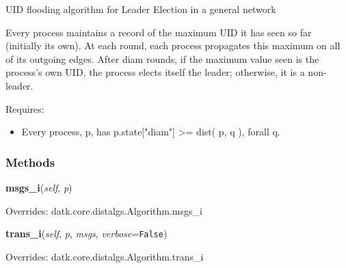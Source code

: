 UID flooding algorithm for Leader Election in a general network

Every process maintains a record of the maximum UID it has seen so far 
(initially its own). At each round, each process propagates this maximum on
all of its outgoing edges. After diam rounds, if the maximum value seen is 
the process's own UID, the process elects itself the leader; otherwise, it 
is a non-leader.

Requires:

\begin{itemize}
\setlength{\parskip}{0.6ex}
  \item Every process, p, has p.state["diam"] {\textgreater}= dist( p, q ), 
    forall q.

\end{itemize}



  \subsubsection{Methods}

    \vspace{0.5ex}

\hspace{.8\funcindent}\begin{boxedminipage}{\funcwidth}

    \raggedright \textbf{msgs\_i}(\textit{self}, \textit{p})

\setlength{\parskip}{2ex}
\setlength{\parskip}{1ex}
      Overrides: datk.core.distalgs.Algorithm.msgs\_i

    \end{boxedminipage}

    \vspace{0.5ex}

\hspace{.8\funcindent}\begin{boxedminipage}{\funcwidth}

    \raggedright \textbf{trans\_i}(\textit{self}, \textit{p}, \textit{msgs}, \textit{verbose}={\tt False})

\setlength{\parskip}{2ex}
\setlength{\parskip}{1ex}
      Overrides: datk.core.distalgs.Algorithm.trans\_i

    \end{boxedminipage}

